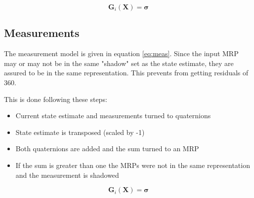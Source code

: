 \begin{equation}\label{eq:meas}
\bm G_i(\bm X) = \bm \sigma
\end{equation}

\subsection{Measurements}

The measurement model is given in equation \ref{eq:meas}. Since the input MRP may or may not be in the same "shadow" set as the state estimate, they are assured to be in the same representation. This prevents from getting residuals of 360\dg. 

This is done following these steps:

\begin{itemize}
\item Current state estimate and measurements turned to quaternions
\item State estimate is transposed (scaled by -1)
\item Both quaternions are added and the sum turned to an MRP
\item If the sum is greater than one the MRPs were not in the same representation and the measurement is shadowed
\end{itemize}

\begin{equation}\label{eq:meas}
\bm G_i(\bm X) = \bm \sigma
\end{equation}
